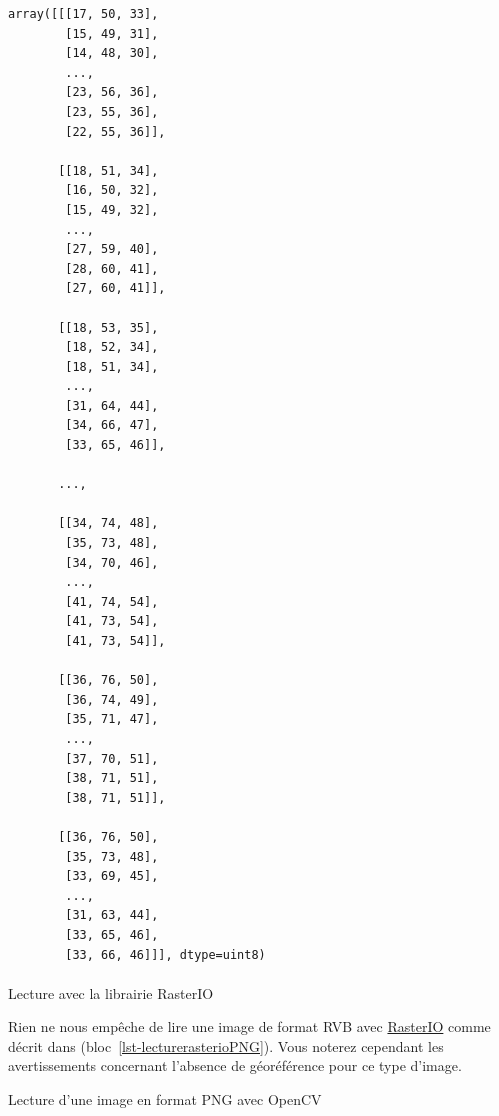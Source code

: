 \documentclass[
  11pt,
  letterpaper,
  open=any,
  twoside=false,
  french]{scrbook}
\makeatletter
\let\oldparagraph\paragraph
\renewcommand{\paragraph}{
    \@ifstar
      \xxxParagraphStar
      \xxxParagraphNoStar
  }
\newcommand{\xxxParagraphStar}[1]{\oldparagraph*{#1}\mbox{}}
\newcommand{\xxxParagraphNoStar}[1]{\oldparagraph{#1}\mbox{}}
\newenvironment{Shaded}{\begin{snugshade}}{\end{snugshade}}
\newcommand{\BuiltInTok}[1]{\textcolor[rgb]{0.00,0.23,0.31}{#1}}
\newcommand{\ImportTok}[1]{\textcolor[rgb]{0.00,0.46,0.62}{#1}}
\newcommand{\NormalTok}[1]{\textcolor[rgb]{0.00,0.23,0.31}{#1}}
\newcommand{\OperatorTok}[1]{\textcolor[rgb]{0.37,0.37,0.37}{#1}}
\newcommand{\StringTok}[1]{\textcolor[rgb]{0.13,0.47,0.30}{#1}}
\makeatother
\begin{document}
\begin{verbatim}
array([[[17, 50, 33],
        [15, 49, 31],
        [14, 48, 30],
        ...,
        [23, 56, 36],
        [23, 55, 36],
        [22, 55, 36]],

       [[18, 51, 34],
        [16, 50, 32],
        [15, 49, 32],
        ...,
        [27, 59, 40],
        [28, 60, 41],
        [27, 60, 41]],

       [[18, 53, 35],
        [18, 52, 34],
        [18, 51, 34],
        ...,
        [31, 64, 44],
        [34, 66, 47],
        [33, 65, 46]],

       ...,

       [[34, 74, 48],
        [35, 73, 48],
        [34, 70, 46],
        ...,
        [41, 74, 54],
        [41, 73, 54],
        [41, 73, 54]],

       [[36, 76, 50],
        [36, 74, 49],
        [35, 71, 47],
        ...,
        [37, 70, 51],
        [38, 71, 51],
        [38, 71, 51]],

       [[36, 76, 50],
        [35, 73, 48],
        [33, 69, 45],
        ...,
        [31, 63, 44],
        [33, 65, 46],
        [33, 66, 46]]], dtype=uint8)
\end{verbatim}

\paragraph{Lecture avec la librairie
RasterIO}\label{lecture-avec-la-librairie-rasterio}

Rien ne nous empêche de lire une image de format RVB avec
\href{https://rasterio.readthedocs.io/en/stable/}{RasterIO} comme décrit
dans (bloc~\ref{lst-lecturerasterioPNG}). Vous noterez cependant les
avertissements concernant l'absence de géoréférence pour ce type
d'image.

\begin{codelisting}

\caption{\label{lst-lecturerasterioPNG}Lecture d'une image en format PNG
avec OpenCV}

\centering{

\begin{Shaded}
\begin{Highlighting}[]
\ImportTok{import}\NormalTok{ rasterio}
\NormalTok{img}\OperatorTok{=}\NormalTok{ rasterio.}\BuiltInTok{open}\NormalTok{(}\StringTok{\textquotesingle{}modis{-}aqua.PNG\textquotesingle{}}\NormalTok{)}
\NormalTok{img}
\end{Highlighting}
\end{Shaded}

}

\end{codelisting}%
\end{document}
